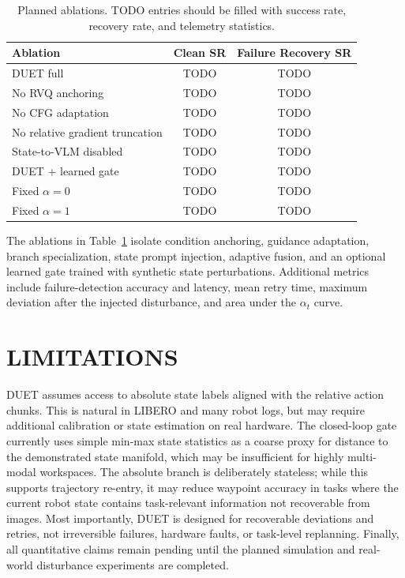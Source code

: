 \documentclass[letterpaper, 10 pt, conference]{ieeeconf}
\begin{document}
\begin{table}[t]
\caption{Planned ablations. TODO entries should be filled with success rate, recovery rate, and telemetry statistics.}
\label{tab:ablations}
\centering
\begin{tabular}{lcc}
\toprule
Ablation & Clean SR & Failure Recovery SR \\
\midrule
DUET full & TODO & TODO \\
No RVQ anchoring & TODO & TODO \\
No CFG adaptation & TODO & TODO \\
No relative gradient truncation & TODO & TODO \\
State-to-VLM disabled & TODO & TODO \\
DUET + learned gate & TODO & TODO \\
Fixed $\alpha=0$ & TODO & TODO \\
Fixed $\alpha=1$ & TODO & TODO \\
\bottomrule
\end{tabular}
\end{table}

The ablations in Table~\ref{tab:ablations} isolate condition anchoring, guidance adaptation, branch specialization, state prompt injection, adaptive fusion, and an optional learned gate trained with synthetic state perturbations. Additional metrics include failure-detection accuracy and latency, mean retry time, maximum deviation after the injected disturbance, and area under the $\alpha_t$ curve.

\section{LIMITATIONS}

DUET assumes access to absolute state labels aligned with the relative action chunks. This is natural in LIBERO and many robot logs, but may require additional calibration or state estimation on real hardware. The closed-loop gate currently uses simple min-max state statistics as a coarse proxy for distance to the demonstrated state manifold, which may be insufficient for highly multi-modal workspaces. The absolute branch is deliberately stateless; while this supports trajectory re-entry, it may reduce waypoint accuracy in tasks where the current robot state contains task-relevant information not recoverable from images. Most importantly, DUET is designed for recoverable deviations and retries, not irreversible failures, hardware faults, or task-level replanning. Finally, all quantitative claims remain pending until the planned simulation and real-world disturbance experiments are completed.
\end{document}
